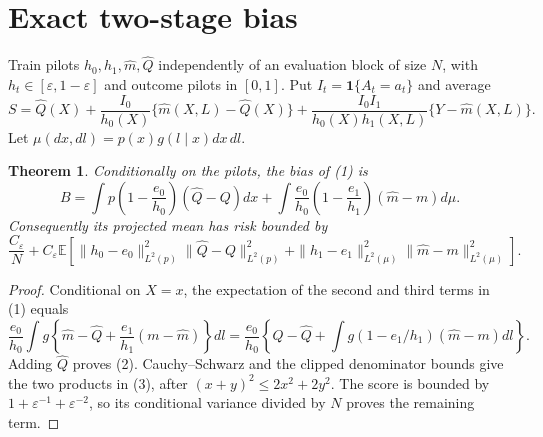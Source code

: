\documentclass[11pt]{article}
\newtheorem{theorem}{Theorem}
\theoremstyle{definition}
\begin{document}
\section*{Exact two-stage bias}
Train pilots $h_0,h_1,\widehat m,\widehat Q$ independently of an evaluation
block of size $N$, with $h_t\in[\varepsilon,1-\varepsilon]$ and outcome
pilots in $[0,1]$. Put $I_t=\mathbf1\{A_t=a_t\}$ and average
\[
 S=\widehat Q(X)+\frac{I_0}{h_0(X)}
       \{\widehat m(X,L)-\widehat Q(X)\}
       +\frac{I_0I_1}{h_0(X)h_1(X,L)}\{Y-\widehat m(X,L)\}.       \tag{1}
\]
Let $\mu(dx,dl)=p(x)g(l\mid x)dx\,dl$.
\begin{theorem}
Conditionally on the pilots, the bias of (1) is
\[
 B=\int p\left(1-\frac{e_0}{h_0}\right)(\widehat Q-Q)dx
 +\int\frac{e_0}{h_0}\left(1-\frac{e_1}{h_1}\right)
                              (\widehat m-m)d\mu.        \tag{2}
\]
Consequently its projected mean has risk bounded by
\[
 \frac{C_\varepsilon}{N}+C_\varepsilon\mathbb E\left[
 \|h_0-e_0\|_{L^2(p)}^2\|\widehat Q-Q\|_{L^2(p)}^2
 +\|h_1-e_1\|_{L^2(\mu)}^2\|\widehat m-m\|_{L^2(\mu)}^2\right].    \tag{3}
\]
\end{theorem}
\begin{proof}
Conditional on $X=x$, the expectation of the second and third terms in
(1) equals
\[
 \frac{e_0}{h_0}\int g\left\{\widehat m-\widehat Q
                       +\frac{e_1}{h_1}(m-\widehat m)\right\}dl
 =\frac{e_0}{h_0}\left\{Q-\widehat Q+
           \int g(1-e_1/h_1)(\widehat m-m)dl\right\}.
\]
Adding $\widehat Q$ proves (2). Cauchy--Schwarz and the clipped denominator
bounds give the two products in (3), after $(x+y)^2\le2x^2+2y^2$.
The score is bounded by $1+\varepsilon^{-1}+\varepsilon^{-2}$, so its
conditional variance divided by $N$ proves the remaining term.
\end{proof}
\end{document}
